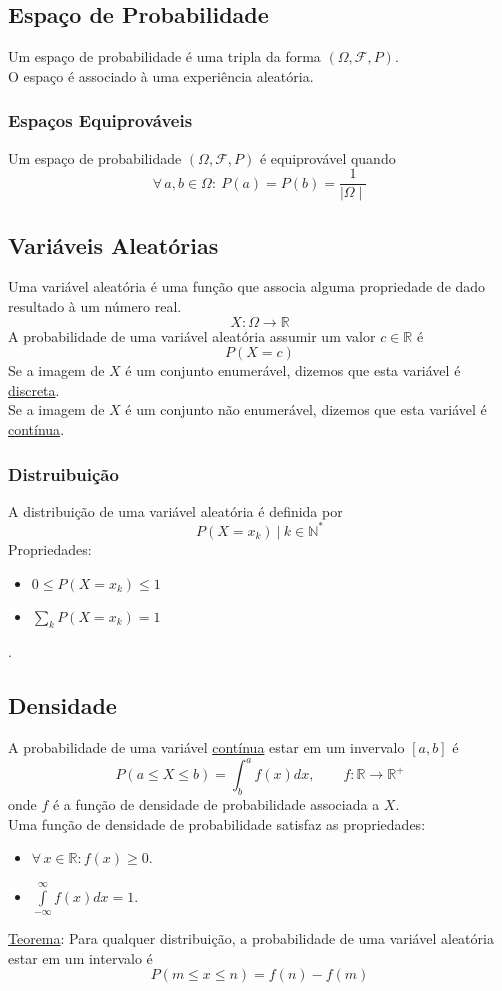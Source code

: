 \documentclass{article}
\begin{document}
\subsection{Espaço de Probabilidade}
Um espaço de probabilidade é uma tripla da forma $(\Omega, \mathcal{F}, P)$. \\
O espaço é associado à uma experiência aleatória.

\subsubsection{Espaços Equiprováveis}
Um espaço de probabilidade $(\Omega, \mathcal{F}, P)$ é equiprovável quando
\[ \forall \, a, b \in \Omega: \> P({a}) = P({b}) = \frac{1}{\mid \Omega \mid} \]


\subsection{Variáveis Aleatórias}
Uma variável aleatória é uma função que associa alguma propriedade de dado resultado à um número real.
\[ X: \Omega \to \mathbb{R} \]
A probabilidade de uma variável aleatória assumir um valor $c \in \mathbb{R}$ é
\[ P(X = c) \]
Se a imagem de $X$ é um conjunto enumerável, dizemos que esta variável é \uline{discreta}. \\[5pt]
Se a imagem de $X$ é um conjunto não enumerável, dizemos que esta variável é \uline{contínua}. \\[5pt]

\subsubsection{Distruibuição}
A distribuição de uma variável aleatória é definida por
\[ P(X = x_k) \:\big|\: k \in \mathbb{N}^* \]
Propriedades:
\begin{itemize}
  \item $0 \leq P(X = x_k) \leq 1$
  \item $\sum\limits_k P(X = x_k) = 1$
\end{itemize}
.


\subsection{Densidade}
A probabilidade de uma variável \uline{contínua} estar em um invervalo $[a,b]$ é
\[ P(a \leq X \leq b) = \int_b^a f(x) dx, \qquad f: \mathbb{R} \to \mathbb{R}^+ \]
onde $f$ é a função de densidade de probabilidade associada a $X$. \\[10pt]
Uma função de densidade de probabilidade satisfaz as propriedades:
\begin{itemize}
  \item $\forall\, x \in \mathbb{R}: f(x) \geq 0$.
  \item $\int\limits_{-\infty}^{\infty} f(x) dx = 1$.
\end{itemize}
\uline{Teorema}: Para qualquer distribuição, a probabilidade de uma variável aleatória estar em um intervalo é
\[ P(m \leq x \leq n) = f(n) - f(m) \]
\end{document}
